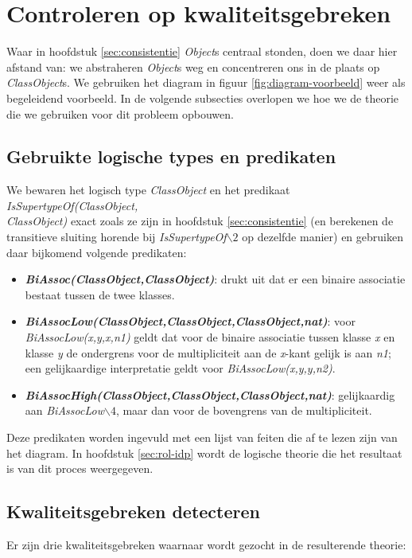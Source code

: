 \section{Controleren op kwaliteitsgebreken}\label{sec:kwaliteitsgebrek}
Waar in hoofdstuk \ref{sec:consistentie} \textit{Object}s centraal stonden, doen we daar hier afstand van: we abstraheren \textit{Object}s weg en concentreren ons in de plaats op \textit{ClassObject}s. We gebruiken het diagram in figuur \ref{fig:diagram-voorbeeld} weer als begeleidend voorbeeld. In de volgende subsecties overlopen we hoe we de theorie die we gebruiken voor dit probleem opbouwen.

\subsection{Gebruikte logische types en predikaten}
We bewaren het logisch type \textit{ClassObject} en het predikaat \textit{IsSupertypeOf(ClassObject,\\ClassObject)} exact zoals ze zijn in hoofdstuk \ref{sec:consistentie} (en berekenen de transitieve sluiting horende bij \textit{IsSupertypeOf$\backslash2$} op dezelfde manier) en gebruiken daar bijkomend volgende predikaten:

\begin{itemize}
	\item \textbf{\textit{BiAssoc(ClassObject,ClassObject)}}: drukt uit dat er een binaire associatie bestaat tussen de twee klasses.
	\item \textbf{\textit{BiAssocLow(ClassObject,ClassObject,ClassObject,nat)}}: voor \textit{BiAssocLow(x,y,x,n1)} geldt dat voor de binaire associatie tussen klasse \textit{x} en klasse \textit{y} de ondergrens voor de multipliciteit aan de \textit{x}-kant gelijk is aan \textit{n1}; een gelijkaardige interpretatie geldt voor \textit{BiAssocLow(x,y,y,n2)}.
	\item \textbf{\textit{BiAssocHigh(ClassObject,ClassObject,ClassObject,nat)}}: gelijkaardig aan \textit{BiAssocLow$\backslash4$}, maar dan voor de bovengrens van de multipliciteit.
\end{itemize}

Deze predikaten worden ingevuld met een lijst van feiten die af te lezen zijn van het diagram. In hoofdstuk \ref{sec:rol-idp} wordt de logische theorie die het resultaat is van dit proces weergegeven.

\subsection{Kwaliteitsgebreken detecteren}
Er zijn drie kwaliteitsgebreken waarnaar wordt gezocht in de resulterende theorie:

